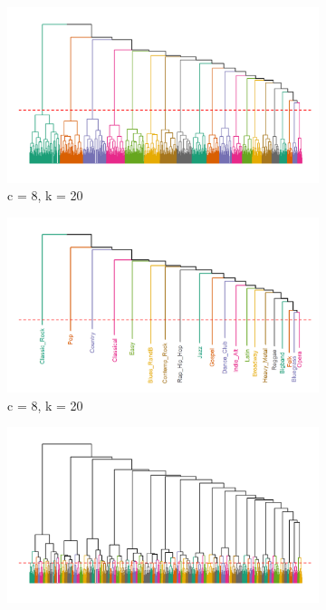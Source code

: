 \documentclass[a4paper,12pt]{extarticle}
\begin{document}
\begin{figure}[ht!]
     \begin{subfigure}[b]{0.5\textwidth}
        \centering
        \includegraphics[width=1.0\textwidth]{Figs/Dend/all-branches-macro.png}
        \caption{c = 8, k = 20}
        \label{fig:dend-macro}
    \end{subfigure} 
     \begin{subfigure}[b]{0.5\textwidth}
        \centering
        \includegraphics[width=1.0\textwidth]{Figs/Dend/all-branches-macro-labels.png}
        \caption{c = 8, k = 20}
        \label{fig:dend-macro-labels}
    \end{subfigure} 
     \begin{subfigure}[b]{0.5\textwidth}
        \centering
        \includegraphics[width=1.0\textwidth]{Figs/Dend/all-branches-micro.png}

\end{subfigure}
\end{figure}
\end{document}
